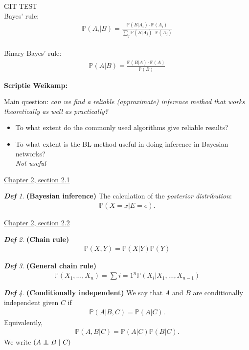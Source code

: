 \documentclass{amsart}
\newcommand\indep{\protect\mathpalette{\protect\independenT}{\perp}}
\def\independenT#1#2{\mathrel{\rlap{$#1#2$}\mkern2mu{#1#2}}}
\theoremstyle{plain}
\theoremstyle{remark}
\newtheorem*{definition*}{\textbf{\em Def}}
\theoremstyle{plain}
\renewcommand{\P}{{\mathbb P}}
\newcommand{\vs}{\vspace{0.75pc}}
\begin{document}
GIT TEST \\

Bayes' rule:
\begin{align*}
\P(A_i|B) = \frac{\P(B|A_i) \cdot \P(A_i)}{\sum_j \P(B|A_j) \cdot \P(A_j)}
\end{align*}\\
Binary Bayes' rule:
\begin{align*}
\P(A|B) = \frac{\P(B|A) \cdot \P(A)}{ \P(B)}
\end{align*} \vs

\textbf{Scriptie Weikamp:}\vs

Main question: \textit{can we find a reliable (approximate) inference method that works theoretically as well as practically?} \\
\begin{itemize}
\item To what extent do the commonly used algorithms give reliable results?
\item To what extent is the BL method useful in doing inference in Bayesian networks? \\ \textit{Not useful}
\end{itemize}\vs

\underline{Chapter 2, section 2.1} \vs

\begin{definition*}\textbf{(Bayesian inference)}
The calculation of the \textit{posterior distribution}:
\begin{align*}
\P(X = x | E = e).
\end{align*}
\end{definition*}\vs

\underline{Chapter 2, section 2.2} \\
\begin{definition*}\textbf{(Chain rule)}
\begin{align*}
\P(X, Y) = \P(X | Y) \P(Y)
\end{align*}
\end{definition*}\vs

\begin{definition*}\textbf{ (General chain rule) }
\begin{align*}
\P(X_1, \ldots, X_n) = \sum{i=1}^n \P(X_i | X_1, \ldots , X_{n-1})
\end{align*}
\end{definition*}\vs

\begin{definition*}\textbf{(Conditionally independent)}
We say that $A$ and $B$ are conditionally independent given $C$ if
\begin{align*}
\P(A | B,C) = \P(A | C).
\end{align*}
Equivalently,
\begin{align*}
\P(A, B | C) = \P(A | C)\P(B| C).
\end{align*}
We write $(A \indep B\ |\ C)$
\end{definition*}\vs
\end{document}
